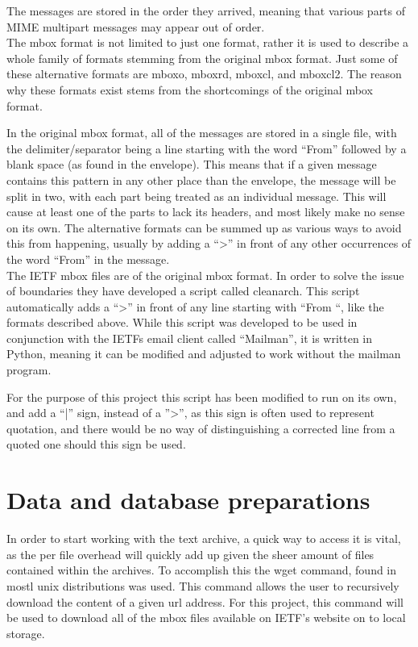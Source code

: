 \documentclass[a4paper,english]{report}
\begin{document}
The messages are stored in the order they arrived, meaning that various parts of  MIME multipart messages may appear out of order.\\

\noindent
The mbox format is not limited to just one format, rather it is used to describe a whole family of formats stemming from the original mbox format. 
Just some of these alternative formats are mboxo, mboxrd, mboxcl, and mboxcl2.
The reason why these formats exist stems from the shortcomings of the original mbox format.

In the original mbox format, all of the messages are stored in a single file, with the delimiter/separator being a line starting with the word “From” followed by a blank space (as found in the envelope). 
This means that if a given message contains this pattern in any other place than the envelope, the message will be split in two, with each part being treated as an individual message. This will cause at least one of the parts to lack its headers, and most likely make no sense on its own.
The alternative formats can be summed up as various ways to avoid this from happening, usually by adding a “>” in front of any other occurrences of the word “From” in the message.\\

The IETF mbox files are of the original mbox format. In order to solve the issue of boundaries they have developed a script called cleanarch. This script automatically adds a “>” in front of any line starting with “From “, like the formats described above. While this script was developed to be used in conjunction with the IETFs email client called “Mailman”, it is written in Python, meaning it can be modified and adjusted to work without the mailman program.

For the purpose of this project this script has been modified to run on its own, and add a “|” sign, instead of a ''>'', as this sign is often used to represent quotation, and there would be no way of distinguishing a corrected line from a quoted one should this sign be used.



\chapter{Data and database preparations}



In order to start working with the text archive, a quick way to access it is vital, as the per file overhead will quickly add up given the sheer amount of files contained within the archives.
To accomplish this the wget command, found in mostl unix distributions was used. This command allows the user to recursively download the content of a given url address. For this project, this command will be used to download all of the mbox files available on IETF's website on to local storage.\\\\
\end{document}
